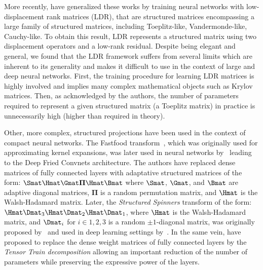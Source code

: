More recently, \citet{thomas2018learning} have generalized these works by training neural networks with low-displacement rank matrices (LDR), that are structured matrices encompassing a large family of structured matrices, including Toeplitz-like, Vandermonde-like, Cauchy-like.
To obtain this result, LDR represents a structured matrix using two displacement operators and a low-rank residual.
Despite being elegant and general, we found that the LDR framework suffers from several limits which are inherent to its generality and makes it difficult to use in the context of large and deep neural networks.
First, the training procedure for learning LDR matrices is highly involved and implies many complex mathematical objects such as Krylov matrices.
Then, as acknowledged by the authors, the number of parameters required to represent a given structured matrix (a Toeplitz matrix) in practice is unnecessarily high (higher than required in theory). 

Other, more complex, structured projections have been used in the context of compact neural networks.
The Fastfood transform~\cite{le2013fastfood}, which was originally used for approximating kernel expansions, was later used in neural networks by~\citet{yang2015deep} leading to the Deep Fried Convnets architecture.
The authors have replaced dense matrices of fully connected layers with adaptative structured matrices of the form: $\Smat\Hmat\Gmat\mathbf{\Pi}\Hmat\Bmat$ where $\Smat$, $\Gmat$, and $\Bmat$ are adaptive diagonal matrices, $\mathbf{\Pi}$ is a random permutation matrix, and $\Hmat$ is the Walsh-Hadamard matrix.
Later, the \emph{Structured Spinners} transform of the form: $\Hmat\Dmat_3\Hmat\Dmat_2\Hmat\Dmat_1$, where $\Hmat$ is the Walsh-Hadamard matrix, and $\Dmat_i$ for $i \in {1, 2, 3}$ is a random $\pm1$-diagonal matrix, was originally proposed by~\citet{andoni2015practical} and used in deep learning settings by~\citet{bojarski2017structured}.
In the same vein, \citet{novikov2015tensorizing} have proposed to replace the dense weight matrices of fully connected layers by the \emph{Tensor Train decomposition} allowing an important reduction of the number of parameters while preserving the expressive power of the layers.





